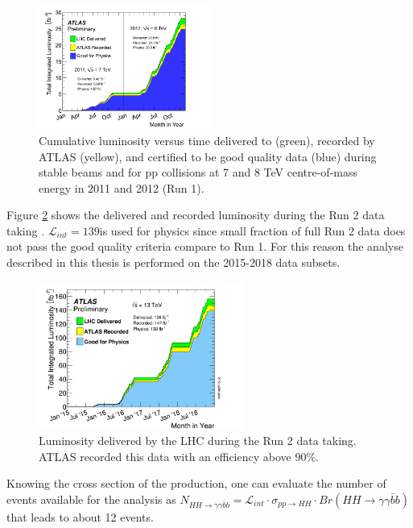 \begin{figure}[H]
    \centering
    \includegraphics[width=0.5\textwidth]{Ch2/Img/LumiRun1.png}
    \caption{Cumulative luminosity versus time delivered to (green), recorded by ATLAS (yellow), and certified to be good quality data (blue) during stable beams and for pp collisions at 7 and 8 TeV centre-of-mass energy in 2011 and 2012 (Run 1).}
    \label{fig:chap2:LHC:Lumi:Run1}
\end{figure}
Figure \ref{fig:chap2:LHC:Lumi} shows the delivered and recorded luminosity during the Run 2 data taking \cite{Lumi2018}. $\mathcal{L}_{int} = 139$\ifb is used for physics since small fraction of full Run 2 data does not pass the good quality criteria compare to Run 1. For this reason the analyse described in this thesis is performed on the 2015-2018 data subsets.\\
\begin{figure}[ht]
    \centering
    \includegraphics[width=0.6\textwidth]{Ch2/Img/Lumi.png}
    \caption{Luminosity delivered by the LHC during the Run 2 data taking. ATLAS recorded this data with an efficiency above 90\%.}
    \label{fig:chap2:LHC:Lumi}
\end{figure}
Knowing the cross section of the \HHyybb production, one can evaluate the number of events available for the analysis as $N_{HH\rightarrow\gamma\gamma\bar{b}b} = \mathcal{L}_{int}\cdot\sigma_{pp\rightarrow HH}\cdot Br(HH\rightarrow\gamma\gamma\bar{b}b)$ that leads to about 12 events.
